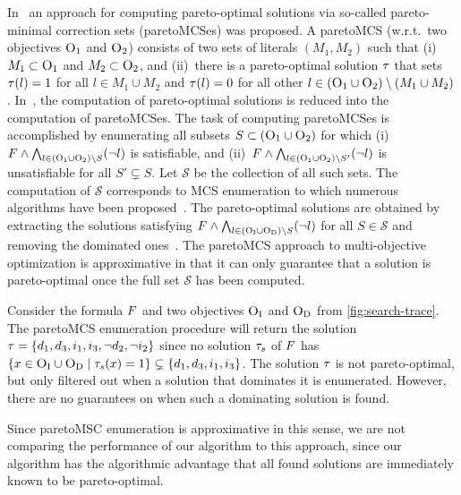 In~\textcite{DBLP:conf/ijcai/Terra-NevesLM18a,DBLP:conf/aaai/Terra-NevesLM18,DBLP:conf/ijcai/Terra-NevesLM18} an approach for computing pareto-optimal solutions via so-called pareto-minimal correction sets (paretoMCSes) was proposed.
A paretoMCS (w.r.t.\ two objectives $\textsc{O}_1$ and $\textsc{O}_2$) consists of two sets of literals $(M_1, M_2)$ such that (i)~$M_1 \subset \textsc{O}_1$ and $M_2 \subset \textsc{O}_2$, and (ii)~there is a pareto-optimal solution $\tau$ that sets $\tau(l) = 1$ for all $l \in M_1 \cup M_2$ and $\tau(l) = 0$ for all other $l \in (\textsc{O}_1 \cup \textsc{O}_2) \setminus (M_1 \cup M_2)$.
In~\textcite{DBLP:conf/ijcai/Terra-NevesLM18a}, the computation of pareto-optimal solutions is reduced into the computation of paretoMCSes.
The task of computing paretoMCSes is accomplished by enumerating all subsets $S \subset  (\textsc{O}_1 \cup \textsc{O}_2)$ for which (i)~$F \land \bigwedge_{l \in  (\textsc{O}_1 \cup \textsc{O}_2) \setminus S} (\lnot l)$ is satisfiable, and (ii)~$F \land \bigwedge_{l \in  (\textsc{O}_1 \cup \textsc{O}_2) \setminus S'} (\lnot l)$ is unsatisfiable for all $S' \subsetneq S$.
Let $\mathcal{S}$ be the collection of all such sets.
The computation of $\mathcal{S}$ corresponds to MCS enumeration to which numerous algorithms have been proposed~\autocite{DBLP:conf/lpar/BendikC20,DBLP:conf/hvc/MorgadoLM12,DBLP:conf/sat/PrevitiMJM17}.
The pareto-optimal solutions are obtained by extracting the solutions satisfying $F \land \bigwedge_{l \in  (\textsc{O}_{\text{I}} \cup \textsc{O}_{\text{D}}) \setminus S} (\lnot l)$ for all $S \in \mathcal{S}$ and removing the dominated ones~\autocite{DBLP:conf/ijcai/Terra-NevesLM18a}.
The paretoMCS approach to multi-objective optimization is approximative in that it can only guarantee that a solution is pareto-optimal once the full set $\mathcal{S}$ has been computed.
\begin{example}\label{ex:MCS}
  Consider the formula $F$ and two objectives $\textsc{O}_{\text{I}}$ and $\textsc{O}_{\text{D}}$ from \cref{fig:search-trace}.
  The paretoMCS enumeration procedure will return the solution $\tau = \{d_1, d_3, i_1, i_3, \lnot d_2, \lnot i_2\}$ since no solution $\tau_s$ of $F$ has $\{x \in \textsc{O}_{\text{I}} \cup \textsc{O}_{\text{D}} \mid  \tau_s(x) = 1\} \subsetneq \{d_1, d_3, i_1, i_3\}$.
  The solution $\tau$ is not pareto-optimal, but only filtered out when a solution that dominates it is enumerated.
  However, there are no guarantees on when such a dominating solution is found. 
\end{example}
Since paretoMSC enumeration is approximative in this sense, we are not comparing the performance of our algorithm to this approach, since our algorithm has the algorithmic advantage that all found solutions are immediately known to be pareto-optimal.

